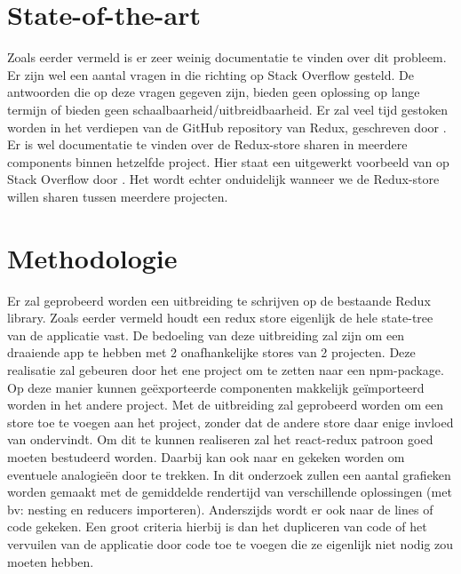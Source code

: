 
\section{State-of-the-art}
\label{sec:state-of-the-art}

Zoals eerder vermeld is er zeer weinig documentatie te vinden over dit probleem. Er zijn wel een aantal vragen in die richting op Stack Overflow gesteld. De antwoorden die op deze vragen gegeven zijn, bieden geen oplossing op lange termijn of bieden geen schaalbaarheid/uitbreidbaarheid. Er zal veel tijd gestoken worden in het verdiepen van de GitHub repository van Redux, geschreven door \cite{Redux01}. Er is wel documentatie te vinden over de Redux-store sharen in meerdere components binnen hetzelfde project. Hier staat een uitgewerkt voorbeeld van op Stack Overflow door \textcite{2017}. Het wordt echter onduidelijk wanneer we de Redux-store willen sharen tussen meerdere projecten.   




\section{Methodologie}
\label{sec:methodologie}
Er zal geprobeerd worden een uitbreiding te schrijven op de bestaande Redux library. Zoals eerder vermeld houdt een redux store eigenlijk de hele state-tree van de applicatie vast. De bedoeling van deze uitbreiding zal zijn om een draaiende app te hebben met 2 onafhankelijke stores van 2 projecten. Deze realisatie zal gebeuren door het ene project om te zetten naar een npm-package. Op deze manier kunnen geëxporteerde componenten makkelijk geïmporteerd worden in het andere project. Met de uitbreiding zal geprobeerd worden om een store toe te voegen aan het project, zonder dat de andere store daar enige invloed van ondervindt. Om dit te kunnen realiseren zal het react-redux patroon goed moeten bestudeerd worden. Daarbij kan ook naar \textcite{Flux01} en \textcite{MobX01} gekeken worden om eventuele analogieën door te trekken. In dit onderzoek zullen een aantal grafieken worden gemaakt met de gemiddelde rendertijd van verschillende oplossingen (met bv: nesting en reducers importeren). Anderszijds wordt er ook naar de lines of code gekeken. Een groot criteria hierbij is dan het dupliceren van code of het vervuilen van de applicatie door code toe te voegen die ze eigenlijk niet nodig zou moeten hebben. 



